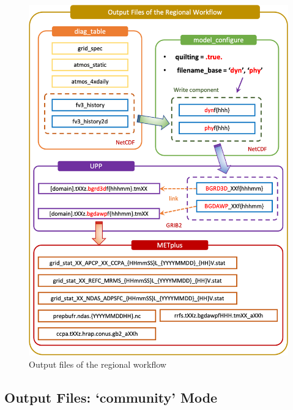 \documentclass[11pt,fleqn]{report}              %
\begin{document}
\begin{figure}[ht!]
  \centering
  \includegraphics[width=0.67\linewidth]{FV3LAM_wflow_output_files.png}
  \caption{Output files of the regional workflow}
  \label{fig:wflow_output_files}
\end{figure}



\vspace{0.5cm}

\subsection{Output Files: `community' Mode}
\label{subsec:wflow_output_community}
\end{document}
